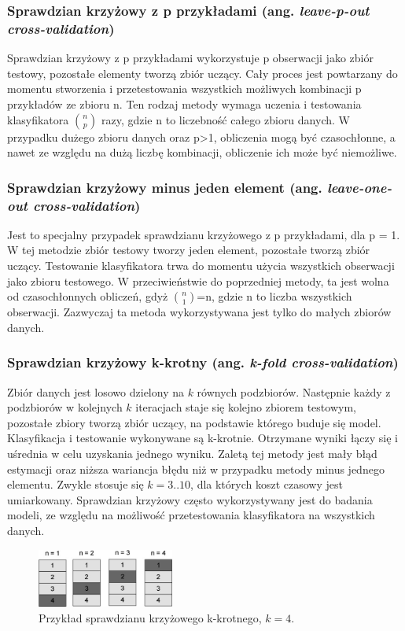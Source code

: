 \subsubsection{Sprawdzian krzyżowy z p przykładami (ang. \textit{leave-p-out cross-validation})}
Sprawdzian krzyżowy z p przykładami wykorzystuje p obserwacji jako zbiór testowy, pozostałe elementy tworzą zbiór uczący. Cały proces jest powtarzany do momentu stworzenia i przetestowania wszystkich możliwych kombinacji p przykładów ze zbioru n. Ten rodzaj metody wymaga uczenia i testowania klasyfikatora $\binom{n}{p}$ razy, gdzie n to liczebność całego zbioru danych. W przypadku dużego zbioru danych oraz p>1, obliczenia mogą być czasochłonne, a nawet ze względu na dużą liczbę kombinacji, obliczenie ich może być niemożliwe.

\subsubsection{Sprawdzian krzyżowy minus jeden element (ang. \textit{leave-one-out cross-validation})}
Jest to specjalny przypadek sprawdzianu krzyżowego z p przykładami, dla p = 1. W tej metodzie zbiór testowy tworzy jeden element, pozostałe tworzą zbiór uczący. Testowanie klasyfikatora trwa do momentu użycia wszystkich obserwacji jako zbioru testowego. W przeciwieństwie do poprzedniej metody, ta jest wolna od czasochłonnych obliczeń, gdyż $\binom{n}{1}$=n, gdzie n to liczba wszystkich obserwacji. Zazwyczaj ta metoda wykorzystywana jest tylko do małych zbiorów danych.

\subsubsection{Sprawdzian krzyżowy k-krotny (ang. \textit{k-fold cross-validation})}
Zbiór danych jest losowo dzielony na $k$ równych podzbiorów. Następnie każdy z podzbiorów w kolejnych $k$ iteracjach staje się kolejno zbiorem testowym, pozostałe zbiory tworzą zbiór uczący, na podstawie którego buduje się model. Klasyfikacja i testowanie wykonywane są k-krotnie. Otrzymane wyniki łączy się i uśrednia w celu uzyskania jednego wyniku. Zaletą tej metody jest mały błąd estymacji oraz niższa wariancja błędu niż w przypadku metody minus jednego elementu. Zwykle stosuje się $k=3..10$, dla których koszt czasowy jest umiarkowany. Sprawdzian krzyżowy często wykorzystywany jest do badania modeli, ze względu na możliwość przetestowania klasyfikatora na wszystkich danych.
\begin{figure}[h]
	\centering
	\includegraphics[width=0.4\textwidth]{./images/crossvalidation.jpg}
	\caption{Przykład sprawdzianu krzyżowego k-krotnego, $k=4$.}
	\label{fig:sprawdziankrzyzowy}
\end{figure}

